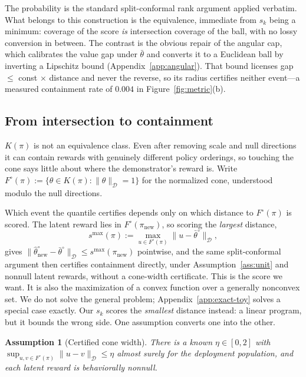 \documentclass{article}
\newtheorem{assumption}{Assumption}
\newcommand{\Dnorm}[1]{\|#1\|_{\mathcal D}}
\begin{document}
The probability is the standard split-conformal rank argument
\citep{vovk2005algorithmic} applied verbatim. What belongs to this construction
is the equivalence, immediate from $s_k$ being a minimum: coverage of the score
\emph{is} intersection coverage of the ball, with no lossy conversion in
between. The contrast is the obvious repair of the angular cap, which
calibrates the value gap under $\bar\theta$ and converts it to a Euclidean ball
by inverting a Lipschitz bound (Appendix~\ref{app:angular}). That bound
licenses gap $\le$ const $\times$ distance and never the reverse, so its radius
certifies neither event---a measured containment rate of $0.004$ in
Figure~\ref{fig:metric}(b).

\subsection{From intersection to containment}
\label{sec:stage2}

$K(\pi)$ is not an equivalence class. Even after removing scale and null
directions it can contain rewards with genuinely different policy orderings, so
touching the cone says little about where the demonstrator's reward is. Write
$F^\circ(\pi):=\{\theta\in K(\pi):\Dnorm{\theta}=1\}$ for the normalized cone,
understood modulo the null directions.

Which event the quantile certifies depends only on which distance to
$F^\circ(\pi)$ is scored. The latent reward lies in
$F^\circ(\pi_{\mathrm{new}})$, so scoring the \emph{largest} distance,
\[
s^{\max}(\pi):=\max_{u\in F^\circ(\pi)}\Dnorm{u-\bar\theta^\circ},
\]
gives $\Dnorm{\hat\theta_{\mathrm{new}}^\circ-\bar\theta^\circ}\le
s^{\max}(\pi_{\mathrm{new}})$ pointwise, and the same split-conformal argument
then certifies containment directly, under Assumption~\ref{ass:unit} and
nonnull latent rewards, without a cone-width certificate.
This is the score we want. It is also the maximization of a convex function
over a generally nonconvex set. We do not solve the general problem;
Appendix~\ref{app:exact-toy} solves a special case exactly. Our $s_k$ scores the
\emph{smallest} distance instead: a linear program, but it bounds the wrong
side. One assumption converts one into the other.

\begin{assumption}[Certified cone width]
\label{ass:cone-width}
There is a known $\eta\in[0,2]$ with
$\sup_{u,v\in F^\circ(\pi)}\Dnorm{u-v}\le\eta$ almost surely for the deployment
population, and each latent reward is behaviorally nonnull.
\end{assumption}
\end{document}
